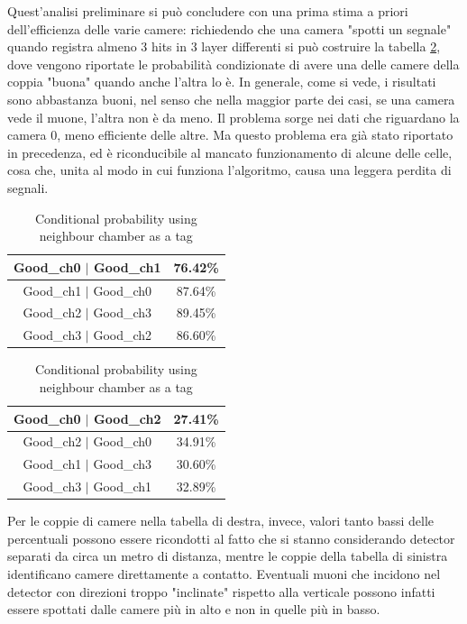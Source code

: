 \documentclass[a4paper,11pt]{book}
\begin{document}
Quest'analisi preliminare si può concludere con una prima stima a priori dell'efficienza delle varie camere: richiedendo che una camera "spotti un segnale" quando registra almeno 3 hits in 3 layer differenti si può costruire la tabella \ref{tab:chamber_efficiency}, dove vengono riportate le probabilità condizionate di avere una delle camere della coppia "buona" quando anche l'altra lo è.  In generale, come si vede, i risultati sono abbastanza buoni, nel senso che nella maggior parte dei casi, se una camera vede il muone, l'altra non è da meno. Il problema sorge nei dati che riguardano la camera 0, meno efficiente delle altre. Ma questo problema era già stato riportato in precedenza, ed è riconducibile al mancato funzionamento di alcune delle celle, cosa che, unita al modo in cui funziona l'algoritmo, causa una leggera perdita di segnali.
\begin{table}[htbp]
\centering
\begin{tabular}{c|c}
\toprule
Good\_ch0 $\mid$ Good\_ch1 &  76.42\% \\
\midrule
Good\_ch1 $\mid$ Good\_ch0 &  87.64\% \\
\midrule
Good\_ch2 $\mid$ Good\_ch3 &  89.45\% \\
\midrule
Good\_ch3 $\mid$ Good\_ch2 &  86.60\% \\
\bottomrule
\end{tabular}
\begin{tabular}{c|c}
\toprule
Good\_ch0 $\mid$ Good\_ch2 &  27.41\% \\
\midrule
Good\_ch2 $\mid$ Good\_ch0 &  34.91\% \\
\midrule
Good\_ch1 $\mid$ Good\_ch3 &  30.60\% \\
\midrule
Good\_ch3 $\mid$ Good\_ch1 &  32.89\% \\
\bottomrule
\end{tabular}
\caption{Conditional probability using neighbour chamber as a tag}
\label{tab:chamber_efficiency}
\end{table}

Per le coppie di camere nella tabella di destra, invece, valori tanto bassi delle percentuali possono essere ricondotti al fatto che si stanno considerando detector separati da circa un metro di distanza, mentre le coppie della tabella di sinistra identificano camere direttamente a contatto. Eventuali muoni che incidono nel detector con direzioni troppo "inclinate" rispetto alla verticale possono infatti essere spottati dalle camere più in alto e non in quelle più in basso.\\
\end{document}
